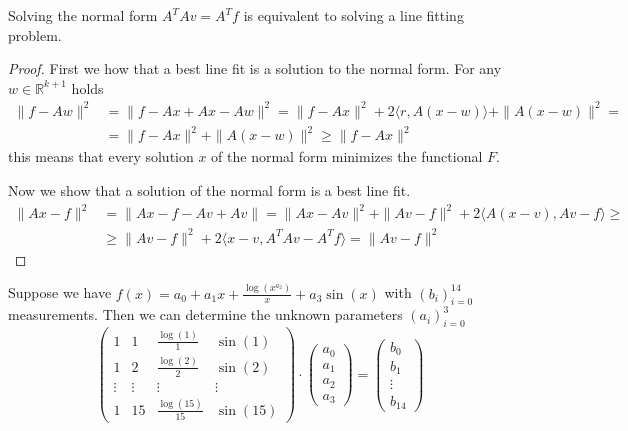 \begin{proposition}
   Solving the normal form \(A^TAv = A^T f\) is equivalent to solving a line fitting problem.
\end{proposition}
\begin{proof}
   First we how that a best line fit is a solution to the normal form.
   For any \(w \in \mathbb{R}^{k+1}\) holds
   \begin{equation*}
      \begin{split}
         \|f - Aw\|^2 & = \|f - Ax + Ax - Aw\|^2 = \|f - Ax\|^2 + 2 \langle r, A(x-w)\rangle + \|A(x-w)\|^2 = \\
                      & = \|f - Ax\|^2 + \|A(x-w)\|^2 \geq \|f - Ax\|^2
      \end{split}
   \end{equation*}
   this means that every solution \(x\) of the normal form minimizes the functional \(F\).

   Now we show that a solution of the normal form is a best line fit.
   \begin{equation*}
      \begin{split}
         \|Ax - f\|^2 & = \|Ax - f -Av + Av\| = \|Ax - Av\|^2 + \|Av - f\|^2 + 2 \langle A(x - v), Av - f\rangle \geq \\
                      & \geq \|Av - f\|^2 + 2 \langle x-v, A^TAv - A^Tf\rangle = \|Av-f\|^2
      \end{split}
   \end{equation*}
\end{proof}

\begin{example}
   Suppose we have \(f(x) = a_0 + a_1x + \frac{\log(x^{a_2})}{x} + a_3 \sin(x)\) with \((b_i)_{i=0}^{14}\) measurements.
   Then we can determine the unknown parameters \((a_i)_{i=0}^3\)
   \[\begin{pmatrix}
         1 & 1 & \frac{\log(1)}{1} & \sin(1)\\
         1 & 2 & \frac{\log(2)}{2} & \sin(2)\\
         \vdots & \vdots & \vdots & \vdots\\
         1 & 15 & \frac{\log(15)}{15} & \sin(15)\end{pmatrix} \cdot \begin{pmatrix}a_0\\a_1\\a_2\\a_3\end{pmatrix} = \begin{pmatrix}b_0\\b_1\\\vdots\\b_14\end{pmatrix}\]
\end{example}

